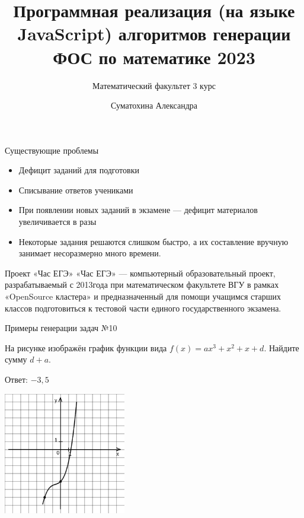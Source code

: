 \documentclass[aspectratio=169]{beamer}
\title{Программная реализация
(на языке JavaScript)
алгоритмов генерации ФОС
по математике 2023}
\subtitle{Математический факультет 3 курс}
\author{Суматохина Александра }
\date{}
\begin{document}
\maketitle

\begin{frame}{Существующие проблемы}
    \begin{itemize}
        \item Дефицит заданий для подготовки
        \item Списывание ответов учениками
        \item При появлении новых заданий в экзамене — дефицит материалов увеличивается в разы
        \item Некоторые задания решаются слишком быстро, а их составление вручную занимает несоразмерно много времени.
    \end{itemize}
\end{frame}

\begin{frame}{Проект «Час ЕГЭ»}
    «Час ЕГЭ» — компьютерный образовательный проект, разрабатываемый с 2013года при математическом факультете ВГУ в рамках «OpenSource кластера» и предназначенный для помощи учащимся старших классов подготовиться к тестовой части единого государственного экзамена.
\end{frame}

\begin{frame}{Примеры генерации задач №10}
    \begin{multicols}{2}
          
        На рисунке изображён график функции вида $f(x)=ax^3+x^2+x+d$. Найдите сумму $d+a$.

        Ответ: $-3,5$
        

        \includegraphics[width=0.4\textwidth]{images/293185407352766n0}
    \end{multicols}
         
\end{frame}
\end{document}
